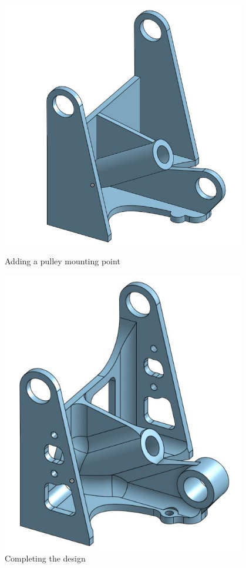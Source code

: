 \begin{figure}[ht]
\centering
\begin{minipage}[b]{.48\textwidth}
  \centering
  \includegraphics[width=0.95\textwidth]{Meetings/November/11-18-21/11-18-21_CAD_Figure3 - Nathan Forrer.JPG}
  \caption{Adding a pulley mounting point}
  \label{fig:pic3}
\end{minipage}%
\hfill%
\begin{minipage}[b]{.48\textwidth}
  \centering
  \includegraphics[width=0.95\textwidth]{Meetings/November/11-18-21/11-18-21_CAD_Figure4 - Nathan Forrer.JPG}
  \caption{Completing the design}
  \label{fig:pic4}
\end{minipage}
\end{figure}


